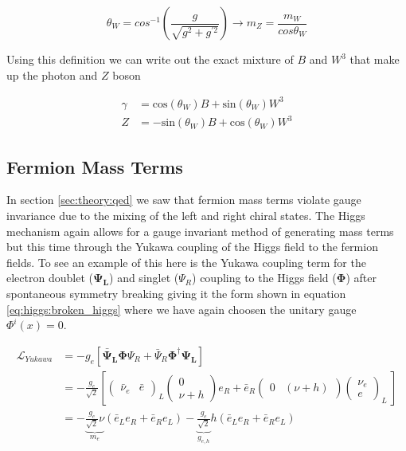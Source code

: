 \begin{equation}
\theta_W = cos^{-1}\left( \frac{g}{\sqrt{g^{2}+g^{'2}}} \right) \rightarrow m_{Z} =
\frac{m_{W}}{cos{\theta_{W}}}
\end{equation}

Using this definition we can write out the exact mixture of $B$ and $W^{3}$ that
make up the photon and $Z$ boson

\begin{align}
\gamma &= \text{cos}(\theta_{W})B + \text{sin}(\theta_{W})W^{3} \\
Z &= -\text{sin}(\theta_{W})B + \text{cos}(\theta_{W})W^{3}
\end{align}

\subsection{Fermion Mass Terms}

In section \ref{sec:theory:qed} we saw that fermion mass terms violate gauge
invariance due to the mixing of the left and right chiral states.  The Higgs
mechanism again allows for a gauge invariant method of generating mass terms but
this time through the Yukawa coupling of the Higgs field to the fermion fields.
To see an example of this here is the Yukawa coupling term for the electron
doublet ($\boldsymbol{\Psi_L}$) and singlet ($\Psi_R$) coupling to the Higgs
field ($\boldsymbol{\Phi}$) after spontaneous symmetry breaking giving it the
form shown in equation \ref{eq:higgs:broken_higgs} where we have again choosen
the unitary gauge $\Phi^{i}(x) = 0$.

\begin{align}
\mathcal{L}_{Yukawa} &= - g_{e} \left[ \boldsymbol{\bar{\Psi}_L}
\boldsymbol{\Phi} \Psi_R + \bar{\Psi}_{R} \boldsymbol{\Phi}^{\dagger} \boldsymbol{\Psi_L}
\right] \\ &= - \frac{g_{e}}{\sqrt{2}} \left[ \left( \begin{matrix}
\bar{\nu}_{e} & \bar{e} \end{matrix} \right)_L \left( \begin{matrix} 0 \\ \nu +
h \end{matrix} \right) e_{R} + \bar{e}_{R} \left( \begin{matrix} 0 & (\nu + h)
\end{matrix} \right) \left( \begin{matrix} \nu_{e} \\ e \end{matrix} \right)_L \ \right] \\ &= - \underbrace{\frac{g_{e}}{\sqrt{2}}
\nu}_{m_{e}} \left( \bar{e}_{L}e_{R} + \bar{e}_{R}e_{L}  \right)
- \underbrace{\frac{g_{e}}{\sqrt{2}}}_{g_{e,h}} h \left(
\bar{e}_{L}e_{R} + \bar{e}_{R}e_{L}  \right) 
\end{align}

